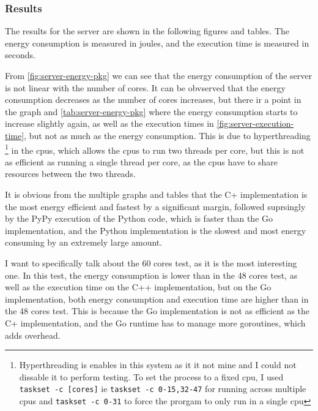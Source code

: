 \subsubsection{Results}

The results for the server are shown in the following figures and tables. The energy consumption is measured in joules, and the execution time is measured in seconds. 








From \autoref{fig:server-energy-pkg} we can see that the energy consumption of the server is not linear with the number of cores. It can be obvserved that the energy consumption decreases as the number of cores increases, but there ir a point in the graph and \autoref{tab:server-energy-pkg} where the energy consumption starts to increase slightly again, as well as the execution times in \autoref{fig:server-execution-time}, but not as much as the energy consumption. 
This is due to hyperthreading \footnote{Hyperthreading is enables in this system as it it not mine and I could not dissable it to perform testing. To set the process to a fixed \gls{cpu}, I used \texttt{taskset -c [cores]} ie \texttt{taskset -c 0-15,32-47} for running across multiple \glspl{cpu} and \texttt{taskset -c 0-31} to force the prorgam to only run in a single \gls{cpu}} in the \glspl{cpu}, which allows the \glspl{cpu} to run two threads per core, but this is not as efficient as running a single thread per core, as the \glspl{cpu} have to share resources between the two threads.

It is obvious from the multiple graphs and tables that the C\++ implementation is the most energy efficient and fastest by a significant margin, followed suprsingly by the PyPy execution of the Python code, which is faster than the Go implementation, and the Python implementation is the slowest and most energy consuming by an extremely large amount.

I want to specifically talk about the 60 cores test, as it is the most interesting one. In this test, the energy consumption is lower than in the 48 cores test, as well as the execution time on the C++ implementation, but on the Go implementation, both energy consumption and execution time are higher than in the 48 cores test. This is because the Go implementation is not as efficient as the C\++ implementation, and the Go runtime has to manage more goroutines, which adds overhead. 

